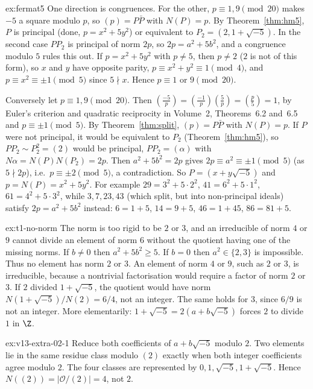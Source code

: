 \begin{solution}{ex:fermat5}
\idea One direction is congruences. For the other, $p\equiv1,9\pmod{20}$ makes $-5$ a square modulo $p$, so $(p)=P\bar P$ with $N(P)=p$. By Theorem~\ref{thm:hm5}, $P$ is principal (done, $p=x^2+5y^2$) or equivalent to $P_2=(2,1+\sqrt{-5})$. In the second case $PP_2$ is principal of norm $2p$, so $2p=a^2+5b^2$, and a congruence modulo $5$ rules this out.
\writeup If $p=x^2+5y^2$ with $p\ne5$, then $p\ne2$ ($2$ is not of this form), so $x$ and $y$ have opposite parity, $p\equiv x^2+y^2\equiv1\pmod4$, and $p\equiv x^2\equiv\pm1\pmod5$ since $5\nmid x$. Hence $p\equiv1$ or $9\pmod{20}$.

Conversely let $p\equiv1,9\pmod{20}$. Then $\left(\frac{-5}p\right)=\left(\frac{-1}p\right)\left(\frac5p\right)=\left(\frac p5\right)=1$, by Euler's criterion and quadratic reciprocity in Volume~2, Theorems~6.2 and~6.5 and $p\equiv\pm1\pmod5$. By Theorem~\ref{thm:split}, $(p)=P\bar P$ with $N(P)=p$. If $P$ were not principal, it would be equivalent to $P_2$ (Theorem~\ref{thm:hm5}), so $PP_2\sim P_2^2=(2)$ would be principal, $PP_2=(\alpha)$ with $N\alpha=N(P)N(P_2)=2p$. Then $a^2+5b^2=2p$ gives $2p\equiv a^2\equiv\pm1\pmod5$ (as $5\nmid 2p$), i.e.\ $p\equiv\pm2\pmod5$, a contradiction. So $P=(x+y\sqrt{-5})$ and $p=N(P)=x^2+5y^2$. For example $29=3^2+5\cdot2^2$, $41=6^2+5\cdot1^2$, $61=4^2+5\cdot3^2$, while $3,7,23,43$ (which split, but into non-principal ideals) satisfy $2p=a^2+5b^2$ instead: $6=1+5$, $14=9+5$, $46=1+45$, $86=81+5$.
\end{solution}

\begin{solution}{ex:t1-no-norm}
\idea The norm is too rigid to be $2$ or $3$, and an irreducible of norm $4$ or $9$ cannot divide an element of norm $6$ without the quotient having one of the missing norms.
\writeup If $b\ne 0$ then $a^2+5b^2\ge 5$. If $b=0$ then $a^2\in\{2,3\}$ is impossible. Thus no element has norm $2$ or $3$. An element of norm $4$ or $9$, such as $2$ or $3$, is irreducible, because a nontrivial factorisation would require a factor of norm $2$ or $3$. If $2$ divided $1+\sqrt{-5}$, the quotient would have norm $N(1+\sqrt{-5})/N(2)=6/4$, not an integer. The same holds for $3$, since $6/9$ is not an integer. More elementarily: $1+\sqrt{-5}=2(a+b\sqrt{-5})$ forces $2$ to divide $1$ in $\Z$.
\end{solution}

\begin{solution}{ex:v13-extra-02-1}
\idea Reduce both coefficients of $a+b\sqrt{-5}$ modulo $2$.
\writeup Two elements lie in the same residue class modulo $(2)$ exactly when both integer coefficients agree modulo $2$. The four classes are represented by $0,1,\sqrt{-5},1+\sqrt{-5}$. Hence $N((2))=|\mathcal O/(2)|=4$, not $2$.
\end{solution}

